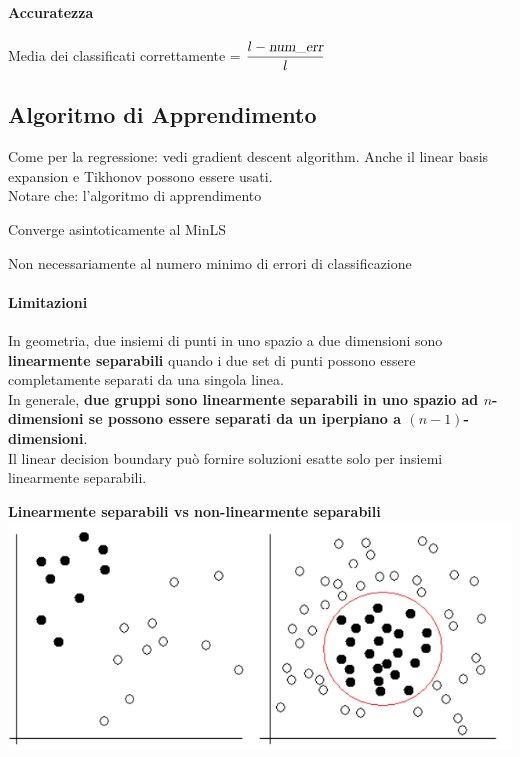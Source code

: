 \documentclass[10pt]{book}
\begin{document}
\paragraph{Accuratezza} Media dei classificati correttamente = $\mathlarger{\frac{l - \textsl{num\_err}}{l}}$
\subsection{Algoritmo di Apprendimento}
Come per la regressione: vedi gradient descent algorithm. Anche il linear basis expansion e Tikhonov possono essere usati.\\
Notare che: l'algoritmo di apprendimento
\begin{list}{}{}
	\item Converge asintoticamente al MinLS
	\item Non necessariamente al numero minimo di errori di classificazione
\end{list}
\paragraph{Limitazioni} In geometria, due insiemi di punti in uno spazio a due dimensioni sono \textbf{linearmente separabili} quando i due set di punti possono essere completamente separati da una singola linea.\\
In generale, \textbf{due gruppi sono linearmente separabili in uno spazio ad $n$-dimensioni se possono essere separati da un iperpiano a $(n-1)$-dimensioni}.\\
Il linear decision boundary può fornire soluzioni esatte solo per insiemi linearmente separabili.
\pagebreak
\begin{center}
\textbf{Linearmente separabili vs non-linearmente separabili}\\
\includegraphics[scale=0.75]{ml_linvsnonlin.png}
\end{center}
\end{document}

